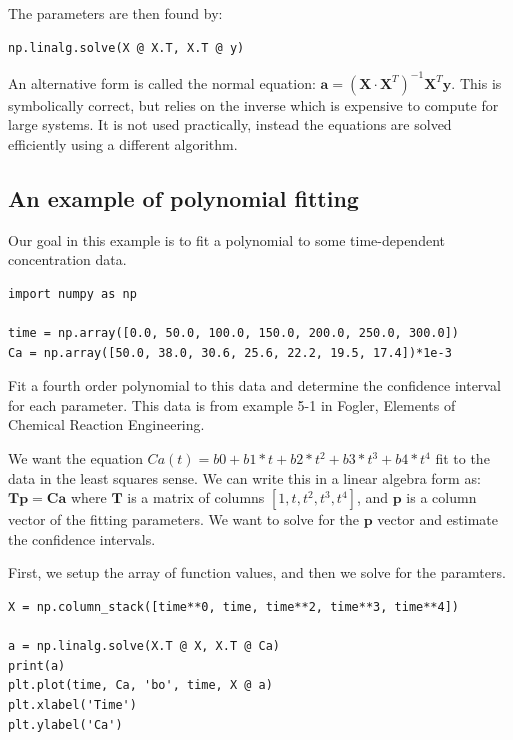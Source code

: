 \documentclass[11pt]{article}
\begin{document}
The parameters are then found by:

\begin{verbatim}
np.linalg.solve(X @ X.T, X.T @ y)
\end{verbatim}

An alternative form is called the normal equation: \(\mathbf{a} = (\mathbf{X}\cdot\mathbf{X}^T)^{-1}\mathbf{X}^T \mathbf{y}\). This is symbolically correct, but relies on the inverse which is expensive to compute for large systems. It is not used practically, instead the equations are solved efficiently using a different algorithm.


\subsection{An example of polynomial fitting}
\label{sec:org74b9aba}

Our goal in this example is to fit a polynomial to some time-dependent concentration data.

\begin{verbatim}
import numpy as np

time = np.array([0.0, 50.0, 100.0, 150.0, 200.0, 250.0, 300.0])
Ca = np.array([50.0, 38.0, 30.6, 25.6, 22.2, 19.5, 17.4])*1e-3
\end{verbatim}

Fit a fourth order polynomial to this data and determine the confidence interval for each parameter. This data is from example 5-1 in Fogler, Elements of Chemical Reaction Engineering.

We want the equation \(Ca(t) = b0 + b1*t + b2*t^2 + b3*t^3 + b4*t^4\) fit to the data in the least squares sense. We can write this in a linear algebra form as: \(\mathbf{T} \mathbf{p} = \mathbf{Ca}\) where \(\mathbf{T}\) is a matrix of columns \([1, t, t^2, t^3, t^4]\), and \(\mathbf{p}\) is a column vector of the fitting parameters. We want to solve for the \(\mathbf{p}\) vector and estimate the confidence intervals.

First, we setup the array of function values, and then we solve for the paramters.

\begin{verbatim}
X = np.column_stack([time**0, time, time**2, time**3, time**4])

a = np.linalg.solve(X.T @ X, X.T @ Ca)
print(a)
plt.plot(time, Ca, 'bo', time, X @ a)
plt.xlabel('Time')
plt.ylabel('Ca')
\end{verbatim}
\end{document}
